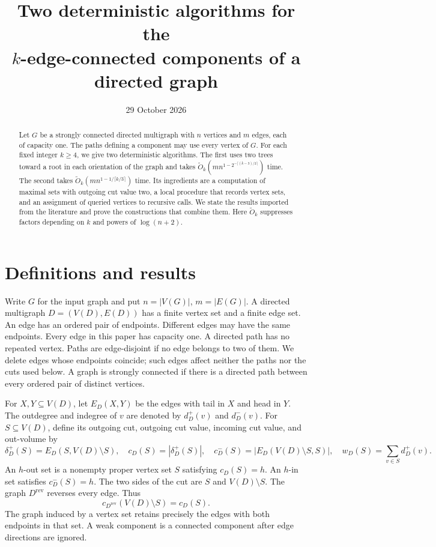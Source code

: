 \documentclass[11pt]{article}
\title{Two deterministic algorithms for the\texorpdfstring{\\}{ }\(k\)-edge-connected components of a directed graph}
\author{}
\date{29 October 2026}
\theoremstyle{definition}
\theoremstyle{remark}
\newcommand{\rev}[1]{#1^{\mathrm{rev}}}
\newcommand{\OO}{\widetilde O}
\begin{document}
\maketitle
\begin{abstract}
Let \(G\) be a strongly connected directed multigraph with \(n\) vertices and \(m\) edges, each of capacity one. The paths defining a component may use every vertex of \(G\). For each fixed integer \(k\ge4\), we give two deterministic algorithms. The first uses two trees toward a root in each orientation of the graph and takes
\(\OO_k(mn^{1-2^{-\lceil(k-3)/2\rceil}})\) time.
The second takes \(\OO_k(mn^{1-1/\lceil k/3\rceil})\) time.
Its ingredients are a computation of maximal sets with outgoing cut value two, a local procedure that records vertex sets, and an assignment of queried vertices to recursive calls. We state the results imported from the literature and prove the constructions that combine them.
Here \(\OO_k\) suppresses factors depending on \(k\) and powers of \(\log(n+2)\).
\end{abstract}
\tableofcontents

\section{Definitions and results}
\label{sec:definitions}

Write \(G\) for the input graph and put \(n=|V(G)|\), \(m=|E(G)|\). A directed multigraph \(D=(V(D),E(D))\) has a finite vertex set and a finite edge set. An edge has an ordered pair of endpoints. Different edges may have the same endpoints. Every edge in this paper has capacity one. A directed path has no repeated vertex. Paths are edge-disjoint if no edge belongs to two of them. We delete edges whose endpoints coincide; such edges affect neither the paths nor the cuts used below. A graph is strongly connected if there is a directed path between every ordered pair of distinct vertices.

For \(X,Y\subseteq V(D)\), let \(E_D(X,Y)\) be the edges with tail in \(X\) and head in \(Y\). The outdegree and indegree of \(v\) are denoted by \(d_D^+(v)\) and \(d_D^-(v)\). For \(S\subseteq V(D)\), define its outgoing cut, outgoing cut value, incoming cut value, and out-volume by
\[
 \delta_D^+(S)=E_D(S,V(D)\setminus S),\quad
 c_D(S)=|\delta_D^+(S)|,\quad
 c_D^-(S)=|E_D(V(D)\setminus S,S)|,\quad
 w_D(S)=\sum_{v\in S}d_D^+(v).
\]
An \(h\)-out set is a nonempty proper vertex set \(S\) satisfying \(c_D(S)=h\). An \(h\)-in set satisfies \(c_D^-(S)=h\). The two sides of the cut are \(S\) and \(V(D)\setminus S\). The graph \(\rev D\) reverses every edge. Thus
\begin{equation}
 c_{\rev D}(V(D)\setminus S)=c_D(S).
 \label{eq:reverse}
\end{equation}
The graph induced by a vertex set retains precisely the edges with both endpoints in that set. A weak component is a connected component after edge directions are ignored.
\end{document}
